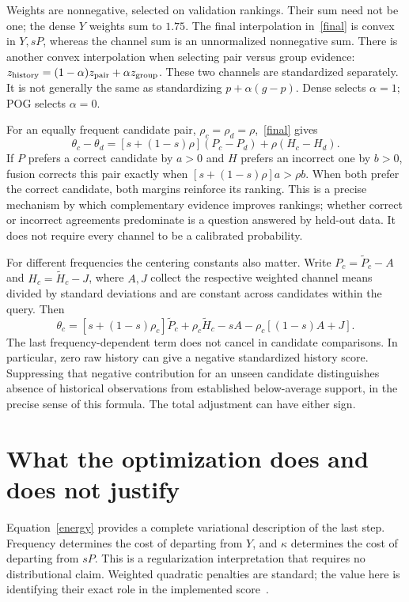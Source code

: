\documentclass[11pt,a4paper]{article}
\begin{document}
Weights are nonnegative, selected on validation rankings. Their sum need not be
one; the dense $Y$ weights sum to $1.75$. The final interpolation in~\eqref{final}
is convex in $Y,sP$, whereas the channel sum is an unnormalized nonnegative sum.
There is another convex interpolation when selecting pair versus group evidence:
$z_{\rm history}=(1-\alpha)z_{\rm pair}+\alpha z_{\rm group}$.
These two channels are standardized separately. It is not generally the same as
standardizing $p+\alpha(g-p)$. Dense selects $\alpha=1$; POG selects $\alpha=0$.

For an equally frequent candidate pair, $\rho_c=\rho_d=\rho$,~\eqref{final} gives
\begin{equation}\label{rankcondition}
 \theta_c-\theta_d=[s+(1-s)\rho](P_c-P_d)+\rho(H_c-H_d).
\end{equation}
If $P$ prefers a correct candidate by $a>0$ and $H$ prefers an incorrect one by
$b>0$, fusion corrects this pair exactly when $[s+(1-s)\rho]a>\rho b$.
When both prefer the correct candidate, both margins reinforce its ranking.
This is a precise mechanism by which complementary evidence improves rankings;
whether correct or incorrect agreements predominate is a question answered by
held-out data. It does not require every channel to be a calibrated probability.

For different frequencies the centering constants also matter. Write
$P_c=\widetilde P_c-A$ and $H_c=\widetilde H_c-J$, where $A,J$ collect the
respective weighted channel means divided by standard deviations and are constant
across candidates within the query. Then
\begin{equation}
 \theta_c=[s+(1-s)\rho_c]\widetilde P_c+\rho_c\widetilde H_c
          -sA-\rho_c[(1-s)A+J].
\end{equation}
The last frequency-dependent term does not cancel in candidate comparisons.
In particular, zero raw history can give a negative standardized history score.
Suppressing that negative contribution for an unseen candidate distinguishes
absence of historical observations from established below-average support, in
the precise sense of this formula. The total adjustment can have either sign.

\section{What the optimization does and does not justify}
Equation~\eqref{energy} provides a complete variational description of the last
step. Frequency determines the cost of departing from $Y$, and $\kappa$ determines
the cost of departing from $sP$. This is a regularization interpretation that
requires no distributional claim. Weighted quadratic penalties are standard;
the value here is identifying their exact role in the implemented score~\cite{boyd}.
\end{document}
